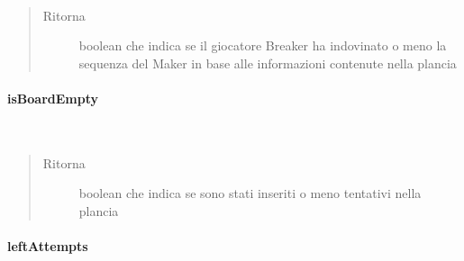 \documentclass[letterpaper,10pt,italian,openany,oneside]{sphinxmanual}
\begin{document}
\begin{fulllineitems}
\label{\detokenize{source/it/unicam/cs/pa/mastermind/gamecore/BoardModel:it.unicam.cs.pa.mastermind.gamecore.BoardModel.hasBreakerGuessed()}}~\begin{quote}\begin{description}
\item[{Ritorna}] \leavevmode
boolean che indica se il giocatore Breaker ha indovinato o meno la sequenza del Maker in base alle informazioni contenute nella plancia

\end{description}\end{quote}

\end{fulllineitems}



\paragraph{isBoardEmpty}
\label{\detokenize{source/it/unicam/cs/pa/mastermind/gamecore/BoardModel:isboardempty}}

\begin{fulllineitems}
\label{\detokenize{source/it/unicam/cs/pa/mastermind/gamecore/BoardModel:it.unicam.cs.pa.mastermind.gamecore.BoardModel.isBoardEmpty()}}~\begin{quote}\begin{description}
\item[{Ritorna}] \leavevmode
boolean che indica se sono stati inseriti o meno tentativi nella plancia

\end{description}\end{quote}

\end{fulllineitems}



\paragraph{leftAttempts}
\label{\detokenize{source/it/unicam/cs/pa/mastermind/gamecore/BoardModel:leftattempts}}
\end{document}
